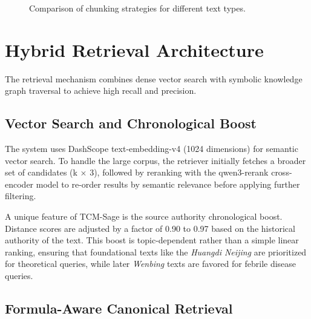 \begin{figure}[H]
\caption{Comparison of chunking strategies for different text types.}
\label{fig:chunking_strategy}
\end{figure}

\section{Hybrid Retrieval Architecture}

The retrieval mechanism combines dense vector search with symbolic knowledge graph traversal to achieve high recall and precision.

\subsection{Vector Search and Chronological Boost}

The system uses DashScope text-embedding-v4 (1024 dimensions) for semantic vector search. To handle the large corpus, the retriever initially fetches a broader set of candidates (k $\times$ 3), followed by reranking with the qwen3-rerank cross-encoder model to re-order results by semantic relevance before applying further filtering.

A unique feature of TCM-Sage is the source authority chronological boost. Distance scores are adjusted by a factor of 0.90 to 0.97 based on the historical authority of the text. This boost is topic-dependent rather than a simple linear ranking, ensuring that foundational texts like the \textit{Huangdi Neijing} are prioritized for theoretical queries, while later \textit{Wenbing} texts are favored for febrile disease queries.

\subsection{Formula-Aware Canonical Retrieval}

